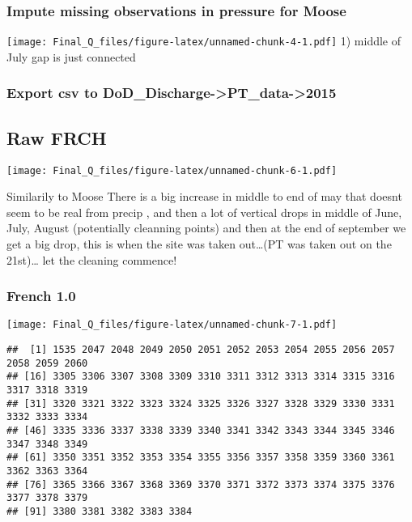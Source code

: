 \documentclass[
]{article}
\begin{document}
\hypertarget{impute-missing-observations-in-pressure-for-moose}{%
\subsubsection{Impute missing observations in pressure for
Moose}\label{impute-missing-observations-in-pressure-for-moose}}

\texttt{[image: Final\_Q\_files/figure-latex/unnamed-chunk-4-1.pdf]} 1)
middle of July gap is just connected

\hypertarget{export-csv-to-dod_discharge-pt_data-2015}{%
\subsubsection{Export csv to
DoD\_Discharge-\textgreater PT\_data-\textgreater2015}\label{export-csv-to-dod_discharge-pt_data-2015}}

\hypertarget{raw-frch}{%
\subsection{Raw FRCH}\label{raw-frch}}

\texttt{[image: Final\_Q\_files/figure-latex/unnamed-chunk-6-1.pdf]}

Similarily to Moose There is a big increase in middle to end of may that
doesnt seem to be real from precip , and then a lot of vertical drops in
middle of June, July, August (potentially cleanning points) and then at
the end of september we get a big drop, this is when the site was taken
out\ldots(PT was taken out on the 21st)\ldots{} let the cleaning
commence!

\hypertarget{french-1.0}{%
\subsubsection{French 1.0}\label{french-1.0}}

\texttt{[image: Final\_Q\_files/figure-latex/unnamed-chunk-7-1.pdf]}

\begin{verbatim}
##  [1] 1535 2047 2048 2049 2050 2051 2052 2053 2054 2055 2056 2057 2058 2059 2060
## [16] 3305 3306 3307 3308 3309 3310 3311 3312 3313 3314 3315 3316 3317 3318 3319
## [31] 3320 3321 3322 3323 3324 3325 3326 3327 3328 3329 3330 3331 3332 3333 3334
## [46] 3335 3336 3337 3338 3339 3340 3341 3342 3343 3344 3345 3346 3347 3348 3349
## [61] 3350 3351 3352 3353 3354 3355 3356 3357 3358 3359 3360 3361 3362 3363 3364
## [76] 3365 3366 3367 3368 3369 3370 3371 3372 3373 3374 3375 3376 3377 3378 3379
## [91] 3380 3381 3382 3383 3384
\end{verbatim}
\end{document}
